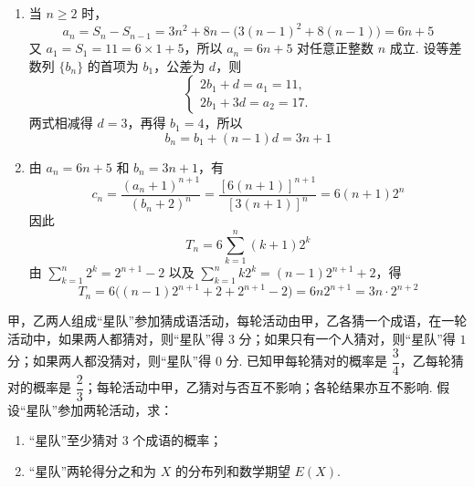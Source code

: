 \begin{solution}
\begin{enumerate}
\item 当 \(n\geq2\) 时，
\[
a_n=S_n-S_{n-1}=3n^2+8n-\bigl(3(n-1)^2+8(n-1)\bigr)=6n+5
\]
又 \(a_1=S_1=11=6\times1+5\)，所以 \(a_n=6n+5\) 对任意正整数 \(n\) 成立. 设等差数列 \(\{b_n\}\) 的首项为 \(b_1\)，公差为 \(d\)，则
\[
\begin{cases}
2b_1+d=a_1=11,\\
2b_1+3d=a_2=17.
\end{cases}
\]
两式相减得 \(d=3\)，再得 \(b_1=4\)，所以
\[
b_n=b_1+(n-1)d=3n+1
\]
\item 由 \(a_n=6n+5\) 和 \(b_n=3n+1\)，有
\[
c_n=\frac{(a_n+1)^{n+1}}{(b_n+2)^n}=\frac{[6(n+1)]^{n+1}}{[3(n+1)]^n}=6(n+1)2^n
\]
因此
\[
T_n=6\sum_{k=1}^n(k+1)2^k
\]
由 \(\sum_{k=1}^n2^k=2^{n+1}-2\) 以及 \(\sum_{k=1}^nk2^k=(n-1)2^{n+1}+2\)，得
\[
T_n=6\bigl((n-1)2^{n+1}+2+2^{n+1}-2\bigr)=6n2^{n+1}=3n\cdot2^{n+2}
\]
\end{enumerate}
\end{solution}

\begin{problem}
甲，乙两人组成“星队”参加猜成语活动，每轮活动由甲，乙各猜一个成语，在一轮活动中，如果两人都猜对，则“星队”得 \(3\) 分；如果只有一个人猜对，则“星队”得 \(1\) 分；如果两人都没猜对，则“星队”得 \(0\) 分. 已知甲每轮猜对的概率是 \(\dfrac34\)，乙每轮猜对的概率是 \(\dfrac23\)；每轮活动中甲，乙猜对与否互不影响；各轮结果亦互不影响. 假设“星队”参加两轮活动，求：
\begin{enumerate}
\item “星队”至少猜对 \(3\) 个成语的概率；
\item “星队”两轮得分之和为 \(X\) 的分布列和数学期望 \(E(X)\).
\end{enumerate}
\end{problem}

